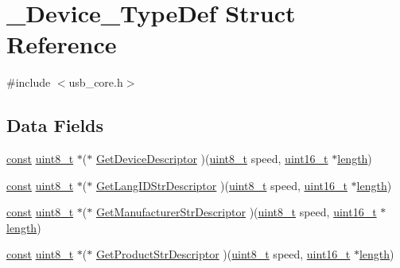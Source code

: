 \hypertarget{struct___device___type_def}{\section{\-\_\-\-Device\-\_\-\-Type\-Def Struct Reference}
\label{struct___device___type_def}
}


{\ttfamily \#include $<$usb\-\_\-core.\-h$>$}

\subsection*{Data Fields}
\begin{DoxyCompactItemize}
\item 
\hyperlink{group___n_a_m_e_ga7ae6d0e43244213b34de2c2b9aa30da6}{const} \hyperlink{stdint_8h_aba7bc1797add20fe3efdf37ced1182c5}{uint8\-\_\-t} $\ast$($\ast$ \hyperlink{struct___device___type_def_a68a0cf34a64ed3e42393032b469c939d}{Get\-Device\-Descriptor} )(\hyperlink{stdint_8h_aba7bc1797add20fe3efdf37ced1182c5}{uint8\-\_\-t} speed, \hyperlink{stdint_8h_a273cf69d639a59973b6019625df33e30}{uint16\-\_\-t} $\ast$\hyperlink{mavlink__helpers_8h_a4254bfa282bd215965d99b8d6b527a04}{length})
\item 
\hyperlink{group___n_a_m_e_ga7ae6d0e43244213b34de2c2b9aa30da6}{const} \hyperlink{stdint_8h_aba7bc1797add20fe3efdf37ced1182c5}{uint8\-\_\-t} $\ast$($\ast$ \hyperlink{struct___device___type_def_ac35004f6d5bd0ec7378daa704087a354}{Get\-Lang\-I\-D\-Str\-Descriptor} )(\hyperlink{stdint_8h_aba7bc1797add20fe3efdf37ced1182c5}{uint8\-\_\-t} speed, \hyperlink{stdint_8h_a273cf69d639a59973b6019625df33e30}{uint16\-\_\-t} $\ast$\hyperlink{mavlink__helpers_8h_a4254bfa282bd215965d99b8d6b527a04}{length})
\item 
\hyperlink{group___n_a_m_e_ga7ae6d0e43244213b34de2c2b9aa30da6}{const} \hyperlink{stdint_8h_aba7bc1797add20fe3efdf37ced1182c5}{uint8\-\_\-t} $\ast$($\ast$ \hyperlink{struct___device___type_def_a8e7e7f01fc5e60c5ff4d8c6d63a02ba0}{Get\-Manufacturer\-Str\-Descriptor} )(\hyperlink{stdint_8h_aba7bc1797add20fe3efdf37ced1182c5}{uint8\-\_\-t} speed, \hyperlink{stdint_8h_a273cf69d639a59973b6019625df33e30}{uint16\-\_\-t} $\ast$\hyperlink{mavlink__helpers_8h_a4254bfa282bd215965d99b8d6b527a04}{length})
\item 
\hyperlink{group___n_a_m_e_ga7ae6d0e43244213b34de2c2b9aa30da6}{const} \hyperlink{stdint_8h_aba7bc1797add20fe3efdf37ced1182c5}{uint8\-\_\-t} $\ast$($\ast$ \hyperlink{struct___device___type_def_ac939e7be62a250840d98eb848b649f9c}{Get\-Product\-Str\-Descriptor} )(\hyperlink{stdint_8h_aba7bc1797add20fe3efdf37ced1182c5}{uint8\-\_\-t} speed, \hyperlink{stdint_8h_a273cf69d639a59973b6019625df33e30}{uint16\-\_\-t} $\ast$\hyperlink{mavlink__helpers_8h_a4254bfa282bd215965d99b8d6b527a04}{length})

\end{DoxyCompactItemize}
